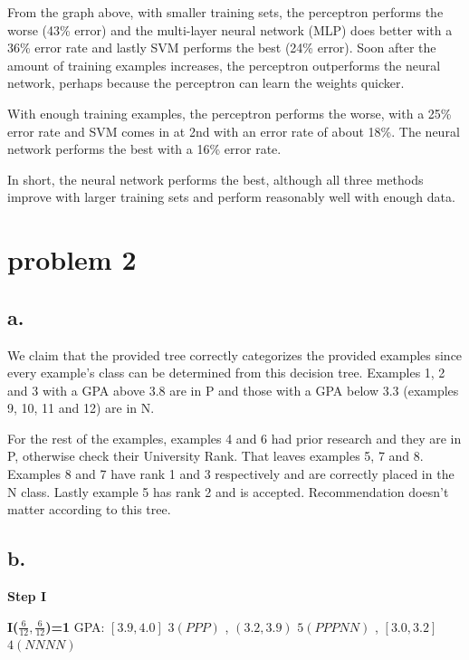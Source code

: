 \documentclass[12pt, letterpaper]{article}
\begin{document}
	\bigskip
	From the graph above, with smaller training sets, the perceptron performs the worse (43\% error) and the multi-layer neural network (MLP) does better with a 36\% error rate and lastly SVM performs the best (24\% error). Soon after the amount of training examples increases, the perceptron outperforms the neural network, perhaps because the perceptron can learn the weights quicker.
	
	With enough training examples, the perceptron performs the worse, with a 25\% error rate and SVM comes in at 2nd with an error rate of about 18\%. The neural network performs the best with a 16\% error rate.
	
	In short, the neural network performs the best, although all three methods improve with larger training sets and perform reasonably well with enough data.
	
	\pagebreak
	\section{problem 2}
	\subsection{a.}
	
	We claim that the provided tree correctly categorizes the provided examples since every example's class can be determined from this decision tree. Examples 1, 2 and 3 with a GPA above 3.8 are in P and those with a GPA below 3.3 (examples 9, 10, 11 and 12) are in N. 
	
	For the rest of the examples, examples 4 and 6 had prior research and they are in P, otherwise check their University Rank. That leaves examples 5, 7 and 8. Examples 8 and 7 have rank 1 and 3 respectively and are correctly placed in the N class. Lastly example 5 has rank 2 and is accepted. Recommendation doesn't matter according to this tree.
	
	\subsection{b.}\large
	\textbf{Step I}
	
	\textbf{I($\frac{6}{12},\frac{6}{12}$)=1}\newline
	GPA: $[3.9,4.0]$ $3(PPP)$ , $(3.2,3.9)$ $5(PPPNN)$ , $[3.0,3.2]$ $4(NNNN)$
	
\end{document}
